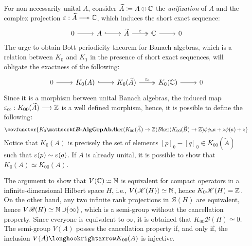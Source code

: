 \begin{definicao}
\begin{itroman}
For non necessarily unital $A$, consider $\widetilde{A} \coloneqq A \oplus \operatorname{\mathbb{C}}$ the \textit{unifization} of $A$ and the complex projection $\varepsilon: \widetilde{A} \longtwoheadrightarrow \C$, which induces the short exact sequence:
\begin{equation*}
    \label{eq:short exact sequence unital}
\begin{tikzcd}
    0 \arrow[r] & A \arrow[r, hook] & \widetilde A \arrow[r, "\varepsilon", two heads] & \mathbb C \arrow[r] & 0
    \end{tikzcd}
\end{equation*}
The urge to obtain Bott periodicity theorem for Banach algebras, which is a relation between $K_0$ and $K_1$ in the presence of short exact sequences, will obligate the exactness of the following:
\begin{equation*}
    \label{eq:K0(short exact sequence unital)}
\begin{tikzcd}
    0 \arrow[r] & K_0(A) \arrow[r, hook] & K_0(\widetilde A) \arrow[r, "\sub\varepsilon0", two heads] & K_0(\mathbb C) \arrow[r] & 0
    \end{tikzcd}
\end{equation*}
Since it is a morphism between unital Banach algebras, the induced map $\sub{\ep}{00} : K_{00}(\widetilde{A}) \longto \Z$ is a well defined morphism, hence, it is possible to define the following:
\begin{equation*}
    \covfunctor{{K_0}{\BAlg}{\Ab{\Grp}}{A}{\ker(K_{00}(\widetilde{A}) \to \Z)}{B}{\ker(K_{00}(\widetilde{B}) \to \Z)}{\phi}{\sub\phi0}{a+ z}{\phi(a)+z}}
\end{equation*}
Notice that $K_0(A)$ is precisely the set of elements $[p]_0-[q]_0 \in K_{00}(\widetilde{A})$ such that $\operatorname{{\varepsilon}}(p) \sim \operatorname{{\varepsilon}}(q)$. If $A$ is already unital, it is possible to show that $K_0(A) \simeq K_{00}(A)$. 
\end{itroman}
\end{definicao}

\begin{observacao}
    The argument to show that $V(\operatorname{\mathbb{C}}) \simeq \operatorname{\mathbb{N}}$  is equivalent for compact operators in a infinite-dimensional Hilbert space $H$, i.e., $V(\mathscr K(H)) \simeq \operatorname{\mathbb{N}}$, hence $K_0\mathscr K(H) = \operatorname{\mathbb{Z}}$. On the other hand, any two infinite rank projections in $\mathscr B(H)$ are equivalent, hence $V\mathscr B(H) \simeq \operatorname{\mathbb{N}} \cup \{\infty\}$, which is a semi-group without the cancellation property. Since everyone is equivalent to $\infty$, it is obtained that $K_{00}\mathscr B(H) \simeq 0$. The semi-group $V(A)$ posses the cancellation property if, and only if, the inclusion $V(A)\longhookrightarrow K_{00}(A)$ is injective. 
\end{observacao}

